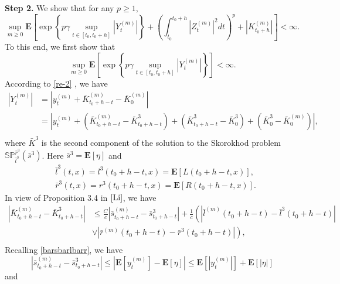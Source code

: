 \documentclass[10pt]{article}%
\numberwithin{equation}{section}
\def \E{\mathbf{E}}
\begin{document}
\iffalse
{\bf Step 2.}  We show that for any $p\geq 1$,
\begin{equation}\label{uniformbounded}
\sup _{m \geq 0} \mathbf{E}\left[\exp \left\{p \gamma \sup _{t \in[t_{0}, t_{0}+h]}\left|Y_t^{(m)}\right|\right\}+\left(\int_{t_{0}}^{t_{0}+h}\left|Z_t^{(m)}\right|^2 d t\right)^p+\left|K_{t_{0}+h}^{(m)}\right|\right]<\infty .
\end{equation}
To this end, we first show that $$\sup_{m\geq 0}\mathbf{E}\left [ \exp\left \{ p\gamma\sup_{t \in[t_{0}, t_{0}+h]}\left | Y_t^{(m)} \right |  \right \}   \right ] <\infty.$$
According to  \eqref{re-2} , we have   
$$
\begin{aligned}
\left|Y^{(m)}_t\right|&=\left|y^{(m)}_t+\bar{K}^{(m)}_{t_0+h-t}-\bar{K}^{(m)}_{0}\right|\\
  &=\left|y^{(m)}_t+(\bar{K}^{(m)}_{t_0+h-t}-\bar{K}^{3}_{t_0+h-t})+(\bar{K}^{3}_{t_0+h-t}-\bar{K}^3_0)+(\bar{K}^{3}_{0}-\bar{K}^{(m)}_{0})\right|\text {, }\\
\end{aligned}
$$
where $\bar{K}^3$ is the second component of the solution to the Skorokhod problem $\mathbb{SP}_{\bar{l}^3}^{\bar{r}^3}(\bar{s}^3)$. Here $\bar{s}^3=\mathbf{E}[\eta]$ and 
\begin{align*}
&\bar{l}^3(t,x)=l^3(t_0+h-t,x)=\mathbf{E}\left[L(t_0+h-t,x)\right], \\
&\bar{r}^3(t,x)=r^3(t_0+h-t,x)=\mathbf{E}\left[R(t_0+h-t,x)\right].
\end{align*}
In view of Proposition 3.4 in $\cite{Li}$, we have
$$
\begin{aligned}
\left|\bar{K}^{(m)}_{t_0+h-t}-\bar{K}^{3}_{t_0+h-t}\right|&\leq\frac{C}{c}\left|\bar{s}^{(m)}_{t_0+h-t}-\bar{s}^{3}_{t_0+h-t}\right|+\frac{1}{c}\left(\left|\bar{l}^{(m)}(t_0+h-t)-\bar{l}^{3}(t_0+h-t)\right|\right.\\
&\left.\vee \left|\bar{r}^{(m)}(t_0+h-t)-\bar{r}^{3}(t_0+h-t)\right|\right),\\%
\end{aligned}
$$
Recalling \eqref{barsbarlbarr}, we have %
$$\left|\bar{s}^{(m)}_{t_0+h-t}-\bar{s}^{3}_{t_0+h-t}\right|\leq\left|\mathbf{E}[y^{(m)}_{t}]-\mathbf{E}[\eta]\right|\leq\mathbf{E}\left[\left|y^{(m)}_{t}\right|\right]+\mathbf{E}\left[\left|\eta\right|\right]$$
and
\end{document}
